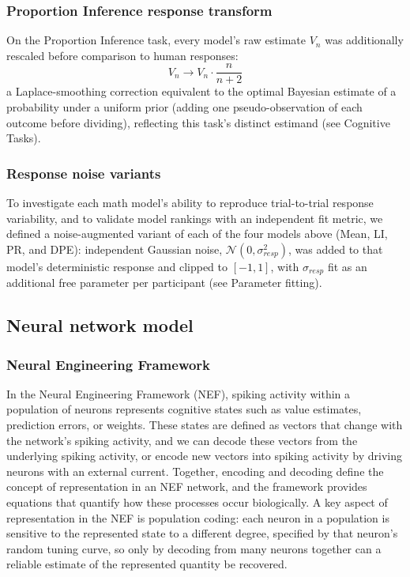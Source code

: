 \documentclass[12pt]{article}
\begin{document}
\subsubsection*{Proportion Inference response transform}
On the Proportion Inference task, every model's raw estimate $V_n$ was additionally rescaled before comparison to human responses:
\begin{equation}
    \label{eq:laplace}
    V_n \to V_n \cdot \frac{n}{n+2}
\end{equation}
a Laplace-smoothing correction equivalent to the optimal Bayesian estimate of a probability under a uniform prior (adding one pseudo-observation of each outcome before dividing), reflecting this task's distinct estimand (see Cognitive Tasks).

\subsubsection*{Response noise variants}
To investigate each math model's ability to reproduce trial-to-trial response variability, and to validate model rankings with an independent fit metric, we defined a noise-augmented variant of each of the four models above (Mean, LI, PR, and DPE): independent Gaussian noise, $\mathcal{N}(0,\sigma_{resp}^2)$, was added to that model's deterministic response and clipped to $[-1,1]$, with $\sigma_{resp}$ fit as an additional free parameter per participant (see Parameter fitting).

\subsection{Neural network model}

\subsubsection*{Neural Engineering Framework}
In the Neural Engineering Framework (NEF), spiking activity within a population of neurons represents cognitive states such as value estimates, prediction errors, or weights. These states are defined as vectors that change with the network's spiking activity, and we can decode these vectors from the underlying spiking activity, or encode new vectors into spiking activity by driving neurons with an external current. Together, encoding and decoding define the concept of representation in an NEF network, and the framework provides equations that quantify how these processes occur biologically. A key aspect of representation in the NEF is population coding: each neuron in a population is sensitive to the represented state to a different degree, specified by that neuron's random tuning curve, so only by decoding from many neurons together can a reliable estimate of the represented quantity be recovered.
\end{document}
